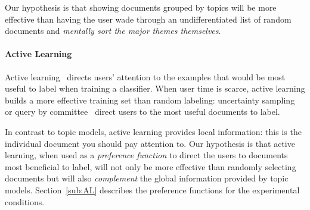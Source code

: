 Our hypothesis is that showing documents grouped by topics will be more effective
than having the user wade through an undifferentiated list of random documents and
\emph{mentally sort the major themes themselves}.













\paragraph{Active Learning}

Active learning~\cite{settles2012active} directs users' attention to
the examples that would be most useful to label when training a
classifier.  When user time is scarce, active learning builds a
more effective training set than random labeling: uncertainty
sampling~\cite{lewis1994sequential} or query by
committee~\cite{seung1992query} direct users to the most useful
documents to label.

In contrast to topic models, active learning provides local
information: this is the individual document you should pay attention
to.  Our hypothesis is that active learning, when used as a
\emph{preference function} to direct the users to documents most
beneficial to label, will not only be more effective than randomly
selecting documents but will also \emph{complement} the global
information provided by topic models. Section~\ref{sub:AL} describes
the preference functions for the experimental conditions.







